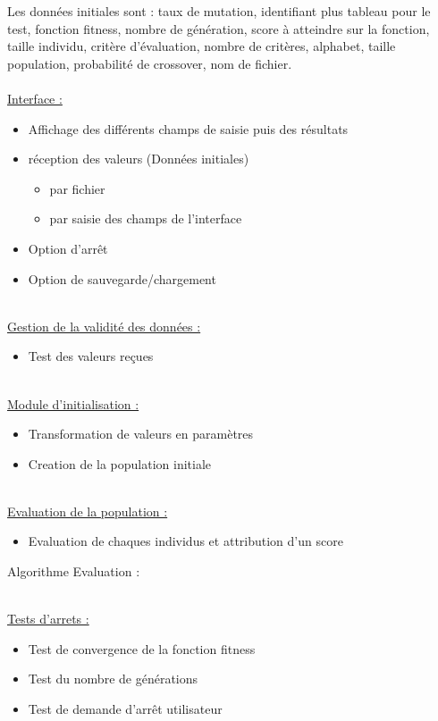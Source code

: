 \documentclass[a4paper,11pt]{article}
\begin{document}
		Les données initiales sont : 	taux de mutation, 
										identifiant plus tableau pour le test, 
										fonction fitness, 
										nombre de génération, 
										score à atteindre sur la fonction, 
										taille individu, 
										critère d’évaluation, 
										nombre de critères, 
										alphabet, 
										taille population, probabilité de crossover, 
										nom de fichier.\\
		\\
		\underline{Interface :}
			\begin{itemize}
			\item Affichage des différents champs de saisie puis des résultats
			\item réception des valeurs (Données initiales)
				\begin{itemize}
				\item par fichier
				\item par saisie des champs de l'interface
				\end{itemize}
			\item Option d'arrêt
			\item Option de sauvegarde/chargement
			\end{itemize}
		
		\hspace{1cm}\\
		\underline{Gestion de la validité des données : }
		\begin{itemize}
			\item Test des valeurs reçues
		\end{itemize}
		
		\hspace{1cm}\\
		\underline{Module d'initialisation : }
		\begin{itemize}
			\item Transformation de valeurs en paramètres
			\item Creation de la population initiale
		\end{itemize}
	
		\hspace{1cm}\\
		\underline{Evaluation de la population : }
		\begin{itemize}
			\item Evaluation de chaques individus et attribution d'un score
		\end{itemize}
		Algorithme Evaluation :
		
		\hspace{1cm}\\
		\underline{Tests d'arrets : }
		\begin{itemize}
			\item Test de convergence de la fonction fitness
			\item Test du nombre de générations
			\item Test de demande d'arrêt utilisateur
		\end{itemize}
\end{document}
